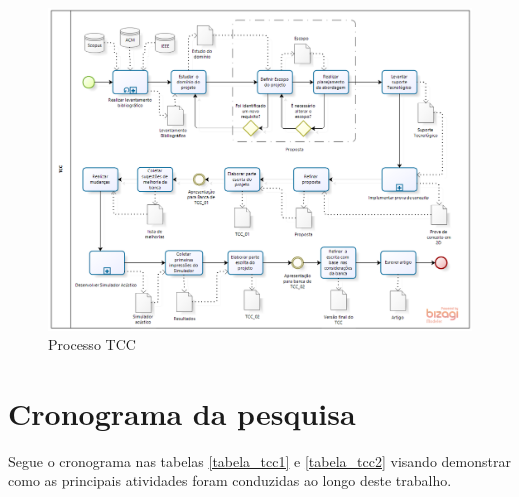 \FloatBarrier 
\begin{figure}[!htb]
\centering
\includegraphics[scale=0.55]{figuras/Processo_TCC}
\caption{Processo TCC}
\label{modelagem}
\end{figure}

\section{Cronograma da pesquisa}

Segue o cronograma nas tabelas \ref{tabela_tcc1} e \ref{tabela_tcc2} visando demonstrar como as principais atividades foram conduzidas ao longo deste trabalho.

